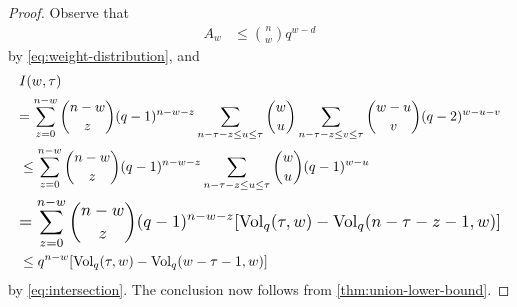 \documentclass[conference]{IEEEtran}
\begin{document}
\begin{proof}
    Observe that 
    \begin{align*}
        A_{w} 
        &\le \binom{n}{w} q^{w - d} 
    \end{align*}
    by \eqref{eq:weight-distribution}, 
    and 
    \begin{align*}
        & I(w, \tau) 
        \ \\ 
        &\resizebox{\hsize}{!}{$\displaystyle = \sum_{z = 0}^{n - w} 
        \binom{n - w}{z} 
        (q - 1)^{n - w - z}
        \sum_{
                n - \tau - z \le u \le \tau %
        } \binom{w}{u} 
        \sum_{
                n - \tau - z \le v \le \tau %
        } 
        \binom{w - u}{v}
        (q - 2)^{w - u - v}$} \\ 
        & %
        \le \sum_{z = 0}^{n - w} 
        \binom{n - w}{z} 
        (q - 1)^{n - w - z}
        \sum_{
                n - \tau - z \le u \le \tau %
        } \binom{w}{u} 
        (q - 1)^{w - u}%
        \\ 
        &\resizebox{\hsize}{!}{$\displaystyle = \sum_{z = 0}^{n - w} 
        \binom{n - w}{z} 
        (q - 1)^{n - w - z} 
        [\Vol_{q}(\tau, w) - \Vol_{q}(n - \tau - z - 1, w)]$} \\ 
        &\le 
        q^{n - w} 
        [\Vol_{q}(\tau, w) - \Vol_{q}(w - \tau - 1, w)] 
    \end{align*}
    by \eqref{eq:intersection}. The conclusion now follows from \autoref{thm:union-lower-bound}. 
\end{proof}
\end{document}
